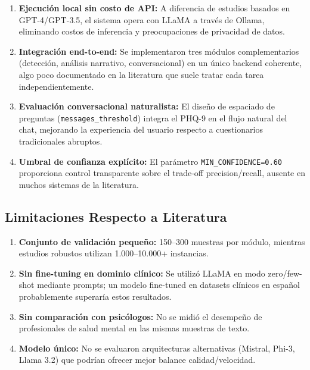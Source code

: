 \begin{enumerate}
    \item \textbf{Ejecución local sin costo de API:} A diferencia de estudios basados en
          GPT-4/GPT-3.5, el sistema opera con LLaMA a través de Ollama, eliminando
          costos de inferencia y preocupaciones de privacidad de datos.

    \item \textbf{Integración end-to-end:} Se implementaron tres módulos complementarios
          (detección, análisis narrativo, conversacional) en un único backend coherente,
          algo poco documentado en la literatura que suele tratar cada tarea
          independientemente.

    \item \textbf{Evaluación conversacional naturalista:} El diseño de espaciado de
          preguntas (\texttt{messages\_threshold}) integra el PHQ-9 en el flujo natural
          del chat, mejorando la experiencia del usuario respecto a cuestionarios
          tradicionales abruptos.

    \item \textbf{Umbral de confianza explícito:} El parámetro \texttt{MIN\_CONFIDENCE=0.60}
          proporciona control transparente sobre el trade-off precision/recall, ausente
          en muchos sistemas de la literatura.
\end{enumerate}

\subsection{Limitaciones Respecto a Literatura}

\begin{enumerate}
    \item \textbf{Conjunto de validación pequeño:} 150–300 muestras por módulo, mientras
          estudios robustos utilizan 1.000–10.000+ instancias.

    \item \textbf{Sin fine-tuning en dominio clínico:} Se utilizó LLaMA en modo
          zero/few-shot mediante prompts; un modelo fine-tuned en datasets clínicos en
          español probablemente superaría estos resultados.

    \item \textbf{Sin comparación con psicólogos:} No se midió el desempeño de
          profesionales de salud mental en las mismas muestras de texto.

    \item \textbf{Modelo único:} No se evaluaron arquitecturas alternativas
          (Mistral, Phi-3, Llama 3.2) que podrían ofrecer mejor balance
          calidad/velocidad.
\end{enumerate}

